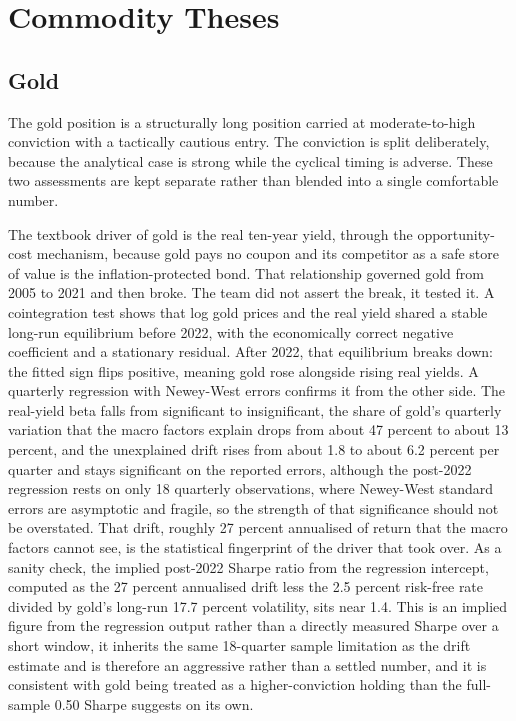 \documentclass[11pt,a4paper]{article}
\begin{document}
\clearpage
\section{Commodity Theses}

\subsection{Gold}

The gold position is a structurally long position carried at moderate-to-high conviction with a tactically cautious entry. The conviction is split deliberately, because the analytical case is strong while the cyclical timing is adverse. These two assessments are kept separate rather than blended into a single comfortable number.

The textbook driver of gold is the real ten-year yield, through the opportunity-cost mechanism, because gold pays no coupon and its competitor as a safe store of value is the inflation-protected bond. That relationship governed gold from 2005 to 2021 and then broke. The team did not assert the break, it tested it. A cointegration test shows that log gold prices and the real yield shared a stable long-run equilibrium before 2022, with the economically correct negative coefficient and a stationary residual. After 2022, that equilibrium breaks down: the fitted sign flips positive, meaning gold rose alongside rising real yields. A quarterly regression with Newey-West errors confirms it from the other side. The real-yield beta falls from significant to insignificant, the share of gold's quarterly variation that the macro factors explain drops from about 47 percent to about 13 percent, and the unexplained drift rises from about 1.8 to about 6.2 percent per quarter and stays significant on the reported errors, although the post-2022 regression rests on only 18 quarterly observations, where Newey-West standard errors are asymptotic and fragile, so the strength of that significance should not be overstated. That drift, roughly 27 percent annualised of return that the macro factors cannot see, is the statistical fingerprint of the driver that took over. As a sanity check, the implied post-2022 Sharpe ratio from the regression intercept, computed as the 27 percent annualised drift less the 2.5 percent risk-free rate divided by gold's long-run 17.7 percent volatility, sits near 1.4. This is an implied figure from the regression output rather than a directly measured Sharpe over a short window, it inherits the same 18-quarter sample limitation as the drift estimate and is therefore an aggressive rather than a settled number, and it is consistent with gold being treated as a higher-conviction holding than the full-sample 0.50 Sharpe suggests on its own.
\end{document}
